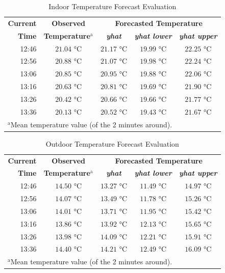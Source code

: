 \documentclass[conference]{IEEEtran}
\begin{document}
\begin{table}[htbp]
\caption{Indoor Temperature Forecast Evaluation}
\begin{center}
\begin{tabular}{|r|c|c|c|c|}
\hline
\textbf{Current} & \textbf{Observed} & \multicolumn{3}{|c|}{\textbf{Forecasted Temperature}} \\
\cline{3-5}
\textbf{Time} & \textbf{Temperature}$^{\mathrm{a}}$ & \textbf{\textit{yhat}} & \textbf{\textit{yhat lower}} & \textbf{\textit{yhat upper}} \\
\hline
12:46 & $21.04$ °C & $21.17$ °C & $19.99$ °C & $22.25$ °C \\
\hline
12:56 & $20.88$ °C & $21.07$ °C & $19.98$ °C & $22.24$ °C \\
\hline
13:06 & $20.85$ °C & $20.95$ °C & $19.88$ °C & $22.06$ °C \\
\hline
13:16 & $20.63$ °C & $20.81$ °C & $19.69$ °C & $21.90$ °C \\
\hline
13:26 & $20.42$ °C & $20.66$ °C & $19.66$ °C & $21.77$ °C \\
\hline
13:36 & $20.13$ °C & $20.52$ °C & $19.43$ °C & $21.67$ °C \\
\hline
\multicolumn{4}{l}{$^{\mathrm{a}}$Mean temperature value (of the 2 minutes around).}
\end{tabular}
\label{tab_forecast_indoor}
\end{center}
\end{table}

\begin{table}[htbp]
\caption{Outdoor Temperature Forecast Evaluation}
\begin{center}
\begin{tabular}{|r|c|c|c|c|}
\hline
\textbf{Current} & \textbf{Observed} & \multicolumn{3}{|c|}{\textbf{Forecasted Temperature}} \\
\cline{3-5}
\textbf{Time} & \textbf{Temperature}$^{\mathrm{a}}$ & \textbf{\textit{yhat}} & \textbf{\textit{yhat lower}} & \textbf{\textit{yhat upper}} \\
\hline
12:46 & $14.50$ °C & $13.27$ °C & $11.49$ °C & $14.97$ °C \\
\hline
12:56 & $14.07$ °C & $13.49$ °C & $11.78$ °C & $15.26$ °C \\
\hline
13:06 & $14.01$ °C & $13.71$ °C & $11.95$ °C & $15.42$ °C \\
\hline
13:16 & $13.86$ °C & $13.92$ °C & $12.13$ °C & $15.65$ °C \\
\hline
13:26 & $13.98$ °C & $14.09$ °C & $12.21$ °C & $15.91$ °C \\
\hline
13:36 & $14.40$ °C & $14.21$ °C & $12.49$ °C & $16.09$ °C \\
\hline
\multicolumn{4}{l}{$^{\mathrm{a}}$Mean temperature value (of the 2 minutes around).}
\end{tabular}
\label{tab_forecast_outdoor}
\end{center}
\end{table}
\end{document}
